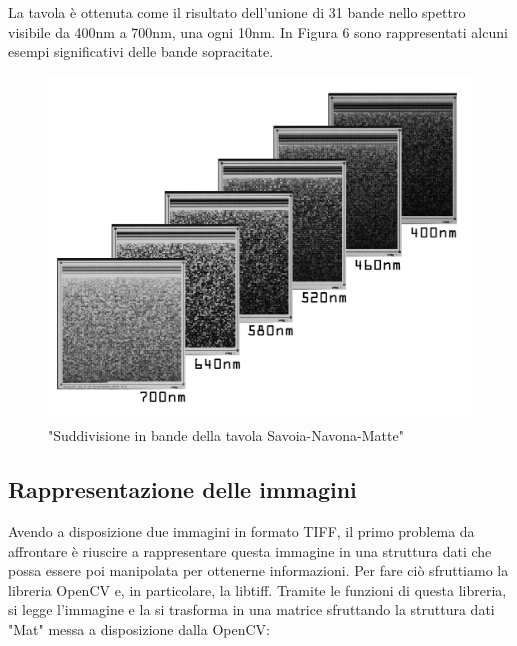 \documentclass[a4paper,11pt]{article}
\begin{document}
    La tavola è ottenuta come il risultato dell'unione di 31 bande nello spettro visibile da 400nm a 700nm, una ogni 10nm.
    In Figura 6 sono rappresentati alcuni esempi significativi delle bande sopracitate.
    \begin{figure}[h]
        \centering
        \includegraphics[scale=0.15]{tavola2}
        \caption{"Suddivisione in bande della tavola Savoia-Navona-Matte"}
    \end{figure}


    \newpage
    \subsection{Rappresentazione delle immagini}
    Avendo a disposizione due immagini in formato TIFF, il primo problema da affrontare è riuscire a rappresentare questa immagine in una struttura dati che possa essere poi manipolata per ottenerne informazioni.
    Per fare ciò sfruttiamo la libreria OpenCV e, in particolare, la libtiff. Tramite le funzioni di questa libreria, si legge l'immagine e la si trasforma in una matrice sfruttando la struttura dati "Mat" messa a disposizione dalla OpenCV: \\
 
\end{document}
